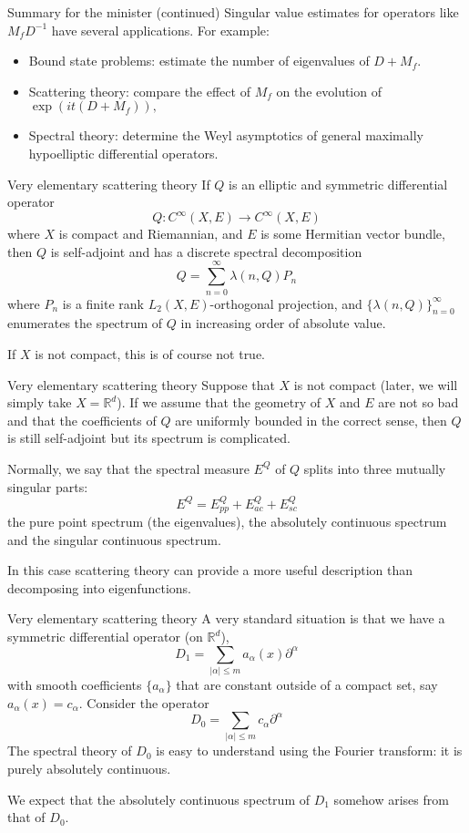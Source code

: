 \documentclass{beamer}
\numberwithin{equation}{section}
\theoremstyle{plain}
\theoremstyle{plain}
\theoremstyle{definition}
\theoremstyle{plain}
\theoremstyle{plain}
\theoremstyle{definition}
\newcommand{\Rl}{\mathbb{R}}
\begin{document}
\begin{frame}{Summary for the minister (continued)}
Singular value estimates for operators like $M_fD^{-1}$ have several applications. For example:
\begin{itemize}
  \item{} Bound state problems: estimate the number of eigenvalues of $D+M_f.$
  \item{} Scattering theory: compare the effect of $M_f$ on the evolution of $\exp(it(D+M_f)),$
  \item{} Spectral theory: determine the Weyl asymptotics of general maximally hypoelliptic differential operators.
\end{itemize}
\end{frame}


\begin{frame}{Very elementary scattering theory}
  If $Q$ is an elliptic and symmetric differential operator
  \[
     Q:C^{\infty}(X,E)\to C^\infty(X,E)
  \]
  where $X$ is compact and Riemannian, and $E$ is some Hermitian vector bundle, then $Q$ is self-adjoint and has a discrete spectral decomposition
  \[
     Q = \sum_{n=0}^\infty \lambda(n,Q)P_n
  \]
  where $P_n$ is a finite rank $L_2(X,E)$-orthogonal projection, and $\{\lambda(n,Q)\}_{n=0}^\infty$ enumerates the spectrum of $Q$ in increasing order of absolute value.

  \pause

  If $X$ is not compact, this is of course not true.
\end{frame}

\begin{frame}{Very elementary scattering theory}
  Suppose that $X$ is not compact (later, we will simply take $X = \Rl^d$). If we assume that the geometry of $X$ and $E$ are not so bad and that the coefficients of $Q$ are uniformly bounded in the correct sense, then $Q$ is still self-adjoint but its spectrum is complicated.

  \pause
  Normally, we say that the spectral measure $E^Q$ of $Q$ splits into three mutually singular parts:
  \[
  E^{Q} = E^Q_{pp}+E^Q_{ac}+E^Q_{sc}
  \]
  the pure point spectrum (the eigenvalues), the absolutely continuous spectrum and the singular continuous spectrum.

  \pause
  In this case scattering theory can provide a more useful description than decomposing into eigenfunctions.
\end{frame}

\begin{frame}{Very elementary scattering theory}
  A very standard situation is that we have a symmetric differential operator (on $\Rl^d$),
  \[
      D_1 = \sum_{|\alpha|\leq m} a_{\alpha}(x)\partial^{\alpha}
  \]
  with smooth coefficients $\{a_{\alpha}\}$ that are constant outside of a compact set, say $a_{\alpha}(x) = c_{\alpha}.$
  \pause
  Consider the operator
  \[
      D_0 = \sum_{|\alpha|\leq m} c_{\alpha}\partial^{\alpha}
  \]
  \pause
  The spectral theory of $D_0$ is easy to understand using the Fourier transform: it is purely absolutely continuous.

  We expect that the absolutely continuous spectrum of $D_1$ somehow arises from that of $D_0.$
\end{frame}
\end{document}
